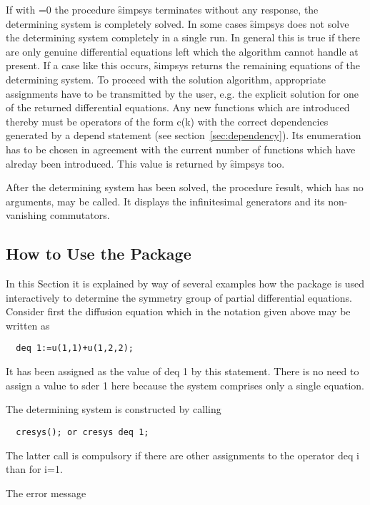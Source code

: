 If with =0 the procedure \f{simpsys} terminates without any
response, the determining system is completely solved.  In some cases
\f{simpsys} does not solve the determining system completely in a single
run. In general this is true if there are only genuine differential
equations left which the algorithm cannot handle at present. If a case
like this occurs, \f{simpsys} returns the remaining equations of the
determining system. To proceed with the solution algorithm,
appropriate assignments have to be transmitted by the user, e.g. the
explicit solution for one of the returned differential equations. Any
new functions which are introduced thereby must be operators of the
form c(k) with the correct dependencies generated by a depend
statement (see section~\ref{sec:dependency}). Its enumeration has to be
chosen in agreement with the current number of functions which have
alreday been introduced.  This value is returned by \f{simpsys} too.

After the determining system has been solved, the procedure \f{result},
which has no arguments, may be called. It displays the infinitesimal
generators and its non-vanishing commutators.


\subsection{How to Use the Package}

In this Section it is explained by way of several examples how the
package  is used interactively to determine the symmetry group of
partial differential equations. Consider first the diffusion equation
which in the notation given above may be written as

\begin{verbatim}
  deq 1:=u(1,1)+u(1,2,2);
\end{verbatim}

It has been assigned as the value of deq 1 by this statement.  There
is no need to assign a value to sder 1 here because the system
comprises only a single equation.

The determining system is constructed by calling

\begin{verbatim}
  cresys(); or cresys deq 1;
\end{verbatim}

The latter call is compulsory if there are other assignments to the
operator deq i than for i=1.

The error message

